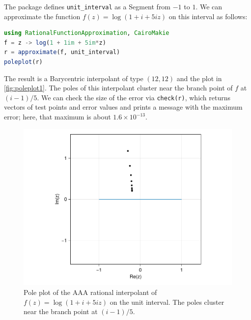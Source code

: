 \documentclass{juliacon}
\begin{document}
The package defines \verb|unit_interval| as a \textsf{Segment} from $-1$ to $1$. We can approximate the function $f(z) = \log(1 + i + 5iz)$ on this interval as follows:
\begin{lstlisting}[language = Julia, caption={Continuum AAA on the unit interval.}, label={lst:log}]
using RationalFunctionApproximation, CairoMakie
f = z -> log(1 + 1im + 5im*z)
r = approximate(f, unit_interval)
poleplot(r)
\end{lstlisting}
The result is a \textsf{Barycentric} interpolant of type $(12,12)$ and the plot in \autoref{fig:poleplot1}. The poles of this interpolant cluster near the branch point of $f$ at $(i-1)/5$. We can check the size of the error via \verb|check(r)|, which returns vectors of test points and error values and prints a message with the maximum error; here, that maximum is about $1.6\times 10^{-13}$. 

\begin{figure}
\centering
\includegraphics[width=\columnwidth]{poleplot1.pdf}
\caption{Pole plot of the AAA rational interpolant of $f(z) = \log(1 + i + 5iz)$ on the unit interval. The poles cluster near the branch point at $(i-1)/5$.}
\label{fig:poleplot1}
\end{figure}
\end{document}

